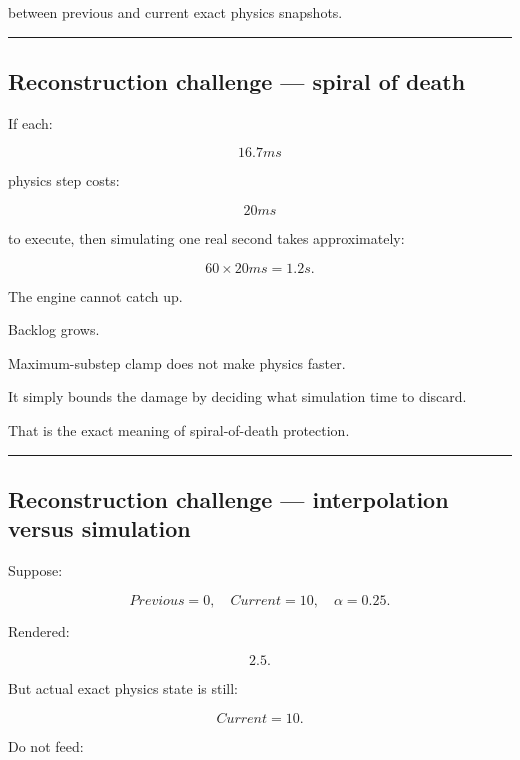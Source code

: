 between previous and current exact physics snapshots.

\begin{center}\rule{0.5\linewidth}{0.5pt}\end{center}

\subsection{Reconstruction challenge --- spiral of death}\label{06-engine-ii-ch038-reconstruction-challenge-spiral-of-death}

\hypertarget{06-engine-ii-ch038-reconstruction-challenge-spiral-of-death}{}

If each:

\[
16.7ms
\]

physics step costs:

\[
20ms
\]

to execute, then simulating one real second takes approximately:

\[
60\times20ms=1.2s.
\]

The engine cannot catch up.

Backlog grows.

Maximum-substep clamp does not make physics faster.

It simply bounds the damage by deciding what simulation time to discard.

That is the exact meaning of spiral-of-death protection.

\begin{center}\rule{0.5\linewidth}{0.5pt}\end{center}

\subsection{Reconstruction challenge --- interpolation versus simulation}\label{06-engine-ii-ch038-reconstruction-challenge-interpolation-versus-simulation}

\hypertarget{06-engine-ii-ch038-reconstruction-challenge-interpolation-versus-simulation}{}

Suppose:

\[
Previous=0,
\quad
Current=10,
\quad
\alpha=0.25.
\]

Rendered:

\[
2.5.
\]

But actual exact physics state is still:

\[
Current=10.
\]

Do not feed:

